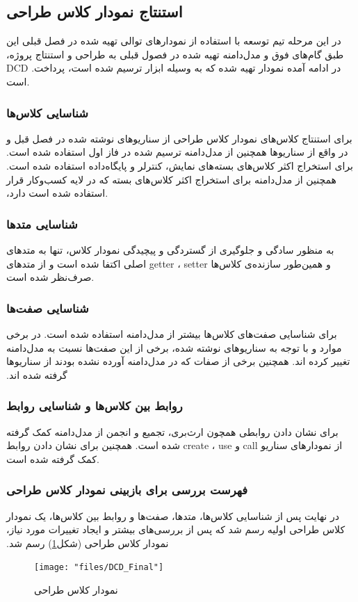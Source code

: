 \documentclass[12pt]{article}
\begin{document}
	\subsection{استنتاج نمودار کلاس طراحی}
	‫در ‬‫این‬ ‫مرحله‬ ‫تیم‬ ‫توسعه‬ ‫با‬ ‫استفاده‬ ‫از‬ ‫نمودارهای‬ ‫توالی‬ ‫تهیه‬ ‫شده‬ ‫در‬ ‫فصل‬ ‫قبلی‬ ‫این‬ ‫پروژه‪،‬‬ ‫طبق‬ ‫گام‬‌‫های‬ فوق ‬‫و‬ ‫مدل‬‌‫دامنه‬ ‬‫تهیه‬ ‫شده‬ ‫در‬ ‫فصول‬ ‫قبلی‬ ‫به‬ ‫طراحی‬ ‫و‬ ‫استنتاج‬ ‫‪DCD‬‬ ‫پرداخت‪.‬‬ ‫نمودار‬ ‫تهیه‬ ‫شده‬ ‫که‬ ‫به ‬‫وسیله‬ ‫‬‫ابزار‬
	 ‫ترسیم‬ ‫شده‬ ‫است‪،‬‬ ‫در‬ ‫ادامه‬ ‫آمده‬ ‫است‬.
	\subsubsection{شناسایی کلاس‌ها}
	‫برای ‬‫استنتاج‬ ‫کلاس‬‌های‬‫ نمودار‬ ‫کلاس‬ ‫طراحی‬ ‫از‬ ‫سناریوهای‬ ‫نوشته‬ ‫شده‬ ‫در‬ ‫فصل‬ ‫قبل‬ ‫و‬ ‫همچنین‬ ‫از‬ ‫مدل‬‌‫دامنه ‬‫ترسیم‬ ‫شده‬ ‫در‬ ‫فاز‬ ‫اول‬ ‫استفاده‬ ‫شده‬ ‫است‪.‬‬ ‫در واقع‬ ‫از‬ ‫سناریوها‬ ‫برای‬ ‫استخراج‬ ‫اکثر‬ ‫کلاس‌های ‬‫بسته‬‌‫های‬ ‫نمایش‪،‬‬‫ کنترلر‬ ‫و‬ ‫پایگاه‌داده‬ ‫استفاده‬ ‫شده‬ ‫است‪.‬‬ ‫همچنین‬ ‫از‬ ‫مدل‬‌‫دامنه‬ ‫برای‬ ‫استخراج‬ ‫اکثر‬ کلاس‌های ‬‫بسته‬
	‫که‬‫ در‬ ‫لایه‬ ‫کسب‌و‬کار‬ ‫قرار‬ ‫دارد‪،‬‬ ‫استفاده‬ ‫شده‬ ‫است‬.
	\subsubsection{شناسایی متدها}
	به منظور سادگی و جلوگیری از گستردگی و پیچیدگی نمودار کلاس، تنها به متدهای اصلی اکتفا شده است و از متدهای
	getter ،
	setter
	و همین‌طور سازنده‌ی کلاس‌ها صرف‌نظر شده است.
	\subsubsection{شناسایی صفت‌ها}
	‫برای ‬‫شناسایی‬ ‫صفت‌های‬ ‫کلاس‌ها‬‫ بیشتر‬ ‫از‬ ‫مدل‌‫دامنه‬ ‫استفاده‬ ‫شده‬ ‫است‪.‬‬ ‫در‬ ‫برخی‬ ‫موارد‬ ‫و‬ ‫با‬ ‫توجه‬ ‫به سناریوهای ‬‫نوشته‬ ‫شده، برخی‬ ‫از‬ ‫این‬ ‫صفت‬‌‫ها ‬‫نسبت‬ ‫به‬ ‫مدل‬‌‫دامنه‬ ‫تغییر‬ ‫کرده‬ ‫اند‪.‬‬‫ همچنین‬ ‫برخی‬ ‫از‬ ‫صفات‬ که ‬‫در‬ ‫مدل‬‌‫دامنه‬ ‫آورده‬ ‫نشده‬ ‫بودند‬ ‫از‬ ‫سناریوها‬ ‫گرفته‬ ‫شده‬ ‫اند‬‫‪.‬‬
	\subsubsection{روابط بین کلاس‌ها و شناسایی روابط}
	برای نشان دادن روابطی همچون ارث‌بری، تجمیع و انجمن از مدل‌دامنه کمک گرفته شده است. همچنین برای نشان دادن روابط create ، use و call از نمودارهای سناریو کمک گرفته شده است.
	\subsubsection{فهرست بررسی برای بازبینی نمودار کلاس طراحی}
	در‬‫ نهایت‬ ‫پس‬ ‫از‬ ‫شناسایی‬ کلاس‌ها، متدها، ‫صفت‌ها‬‫ و ‫روابط‬ ‫بین‬ ‫کلاس‌ها،‬‫ یک نمودار ‫کلاس‬ ‫طراحی ‫اولیه‬ ‫رسم‬ ‫شد‬‫ که‬ ‫پس‬ ‫از‬ ‫بررسی‌های ‬‫بیشتر‬ ‫و‬ ‫ایجاد‬ ‫تغییرات‬ ‫مورد ‬‫نیاز، ‫نمودار‬ ‫کلاس‬ ‫طراحی‬ (شکل\ref{fig:class-diagram}) ‫رسم‬ ‫شد‬.‬‬\\
	\begin{figure}[H]
		\centering
		\texttt{[image: "files/DCD\_Final"]}
		\caption{نمودار کلاس طراحی}
		\label{fig:class-diagram}
	\end{figure}
\end{document}
